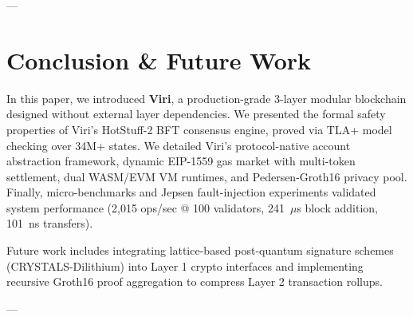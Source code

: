 \documentclass[10pt,journal,compsoc,twocolumn]{IEEEtran}
\begin{document}
---

\section{Conclusion \& Future Work}
\label{sec:conclusion}

In this paper, we introduced \textbf{Viri}, a production-grade 3-layer modular blockchain designed without external layer dependencies. We presented the formal safety properties of Viri's HotStuff-2 BFT consensus engine, proved via TLA+ model checking over 34M+ states. We detailed Viri's protocol-native account abstraction framework, dynamic EIP-1559 gas market with multi-token settlement, dual WASM/EVM VM runtimes, and Pedersen-Groth16 privacy pool. Finally, micro-benchmarks and Jepsen fault-injection experiments validated system performance (2,015 ops/sec @ 100 validators, 241~$\mu$s block addition, 101~ns transfers). 

Future work includes integrating lattice-based post-quantum signature schemes (CRYSTALS-Dilithium) into Layer 1 crypto interfaces and implementing recursive Groth16 proof aggregation to compress Layer 2 transaction rollups.

---



\end{document}
